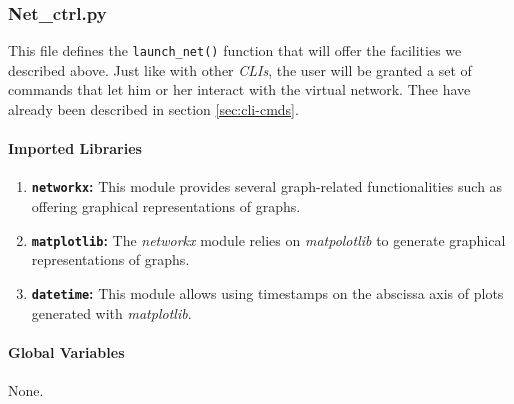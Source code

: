 \subsubsection{Net\_ctrl.py}
    This file defines the \texttt{launch\_net()} function that will offer the facilities we described above. Just like with other \textit{CLIs}, the user will be granted a set of commands that let him or her interact with the virtual network. Thee have already been described in section \ref{sec:cli-cmds}.\\

    \paragraph{Imported Libraries}
        \begin{enumerate}
            \item \textbf{\texttt{networkx}:} This module provides several graph-related functionalities such as offering graphical representations of graphs.
            \item \textbf{\texttt{matplotlib}:} The \textit{networkx} module relies on \textit{matpolotlib} to generate graphical representations of graphs.
            \item \textbf{\texttt{datetime}:} This module allows using timestamps on the abscissa axis of plots generated with \textit{matplotlib}.
        \end{enumerate}

    \paragraph{Global Variables}
        None.

